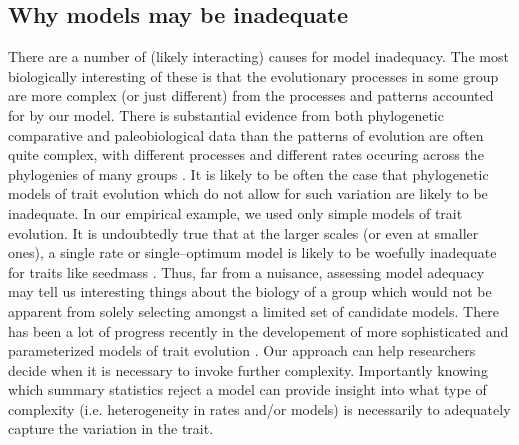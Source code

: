 \documentclass[a4paper,12pt]{article}
\begin{document}
\subsection*{Why models may be inadequate}
There are a number of (likely interacting) causes for model inadequacy. The most biologically interesting of these is that the evolutionary processes in some group are more complex (or just different) from the processes and patterns accounted for by our model.  There is substantial evidence from both phylogenetic comparative and paleobiological data than the patterns of evolution are often quite complex, with different processes and different rates occuring across the phylogenies of many groups \citep[e.g.][]{Simpson1953, Foote1997, Grey2008, Hunt2012, Hopkins2012, PennellPE}. It is likely to be often the case that phylogenetic models of trait evolution which do not allow for such variation are likely to be inadequate. In our empirical example, we used only simple models of trait evolution. It is undoubtedly true that at the larger scales (or even at smaller ones), a single rate or single--optimum model is likely to be woefully inadequate for traits like seedmass \citep[see][]{Moles2005}. Thus, far from a nuisance, assessing model adequacy may tell us interesting things about the biology of a group which would not be apparent from solely selecting amongst a limited set of candidate models. There has been a lot of progress recently in the developement of more sophisticated and parameterized models of trait evolution \citep[e.g.][]{ButlerKing2004, Omeara2006, FitzJohn2010, Eastman2011, Revell2012, Venditti2012, Beaulieu2012, UyedaBayou}. Our approach can help researchers decide when it is necessary to invoke further complexity. Importantly knowing which summary statistics reject a model can provide insight into what type of complexity (i.e. heterogeneity in rates and/or models) is necessarily to adequately capture the variation in the trait.
\end{document}
